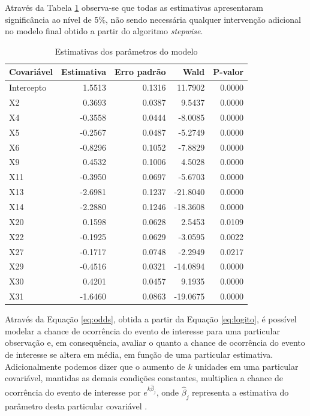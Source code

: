 \documentclass[twocolumn]{rbef}
\newcommand{\1}{\mathbbm{1}}
\begin{document}
Através da Tabela \ref{tab:coefs} observa-se que todas as estimativas apresentaram significância ao nível de 5\%, não sendo necessária qualquer intervenção adicional no modelo final obtido a partir do algoritmo \textit{stepwise}.

\begin{table}

\caption{\label{tab:coefs}Estimativas dos parâmetros do modelo}
\centering
\fontsize{9}{11}\selectfont
\begin{tabular}[t]{lrrrr}
\toprule
Covariável & Estimativa & Erro padrão & Wald & P-valor\\
\midrule
Intercepto & 1.5513 & 0.1316 & 11.7902 & 0.0000\\
X2 & 0.3693 & 0.0387 & 9.5437 & 0.0000\\
X4 & -0.3558 & 0.0444 & -8.0085 & 0.0000\\
X5 & -0.2567 & 0.0487 & -5.2749 & 0.0000\\
X6 & -0.8296 & 0.1052 & -7.8829 & 0.0000\\
\addlinespace
X9 & 0.4532 & 0.1006 & 4.5028 & 0.0000\\
X11 & -0.3950 & 0.0697 & -5.6703 & 0.0000\\
X13 & -2.6981 & 0.1237 & -21.8040 & 0.0000\\
X14 & -2.2880 & 0.1246 & -18.3608 & 0.0000\\
X20 & 0.1598 & 0.0628 & 2.5453 & 0.0109\\
\addlinespace
X22 & -0.1925 & 0.0629 & -3.0595 & 0.0022\\
X27 & -0.1717 & 0.0748 & -2.2949 & 0.0217\\
X29 & -0.4516 & 0.0321 & -14.0894 & 0.0000\\
X30 & 0.4201 & 0.0457 & 9.1935 & 0.0000\\
X31 & -1.6460 & 0.0863 & -19.0675 & 0.0000\\
\bottomrule
\end{tabular}
\end{table}

Através da Equação \eqref{eq:odds}, obtida a partir da Equação \eqref{eq:logito}, é possível modelar a chance de ocorrência do evento de interesse para uma particular observação e, em consequência, avaliar o quanto a chance de ocorrência do evento de interesse se altera em média, em função de uma particular estimativa. Adicionalmente podemos dizer que o aumento de \(k\) unidades em uma particular covariável, mantidas as demais condições constantes, multiplica a chance de ocorrência do evento de interesse por \(e^{k\hat{\beta}_j}\), onde \(\hat{\beta}_j\) representa a estimativa do parâmetro desta particular covariável \cite{Favero2017}.
\end{document}
